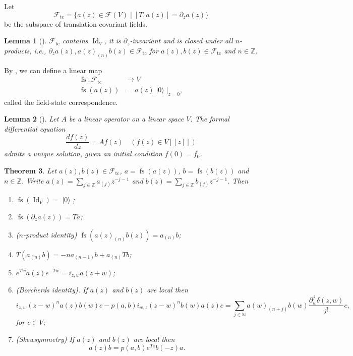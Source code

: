 \documentclass[a4paper, 12pt, reqno]{amsart}
\newtheorem{theorem}{Theorem}[subsection]
\newtheorem{lemma}[theorem]{Lemma}
\theoremstyle{remark}
\numberwithin{equation}{subsection}
\DeclareMathOperator{\Id}{Id}
\DeclareMathOperator{\vac}{|0\rangle}
\DeclareMathOperator{\fs}{fs}
\DeclareMathOperator{\tc}{tc}
\begin{document}
Let
\begin{equation*}
  \mathcal{F}_{\tc} = \{a(z) \in \mathcal{F}(V) \mid [T, a(z)] = \partial_za(z)\}
\end{equation*}
be the subspace of translation covariant fields.

\begin{lemma}[{\cite[Lemma 3]{callegaro_introduction_2017}}]
  \label{lmm:5}
  $\mathcal{F}_{\tc}$ contains $\Id_V$, it is $\partial_z$-invariant and is closed under all $n$-products, i.e., $\partial_za(z), a(z)_{(n)}b(z) \in \mathcal{F}_{\tc}$ for $a(z), b(z) \in \mathcal{F}_{\tc}$ and $n \in \mathbb{Z}$.
\end{lemma}

By , we can define a linear map
\begin{align*}
  \fs: \mathcal{F}_{\tc} &\to V \\
  \fs(a(z)) &= a(z)\vac|_{z = 0},
\end{align*}
called the field-state correspondence.

\begin{lemma}[{\cite[Proposition 4.3.2]{nozaradan_introduction_2008}}]
  \label{lmm:6}
  Let $A$ be a linear operator on a linear space $V$.
  The formal differential equation
  \begin{equation*}
    \frac{df(z)}{dz} = Af(z) \quad (f(z) \in V[[z]])
  \end{equation*}
  admits a unique solution, given an initial condition $f(0)=f_0$.
\end{lemma}

\begin{theorem}
  \label{thr:12}
  Let $a(z), b(z) \in \mathcal{F}_{\tc}$, $a = \fs(a(z))$, $b = \fs(b(z))$ and $n \in \mathbb{Z}$.
  Write $a(z) = \sum_{j \in \mathbb{Z}}a_{(j)}z^{-j - 1}$ and $b(z) = \sum_{j \in \mathbb{Z}}b_{(j)}z^{-j - 1}$.
  Then
  \begin{enumerate}
  \item $\fs(\Id_V) = \vac$;
  \item $\fs(\partial_za(z)) = Ta$;
  \item ($n$-product identity) $\fs(a(z)_{(n)}b(z)) = a_{(n)}b$;
  \item $T(a_{(n)}b) = -na_{(n - 1)}b + a_{(n)}Tb$;
  \item $e^{Tw}a(z)e^{-Tw} = i_{z, w}a(z + w)$;
  \item (Borcherds identity). If $a(z)$ and $b(z)$ are local then
    \begin{equation*}
      i_{z,w}(z-w)^na(z)b(w)c-p(a,b)i_{w,z}(z-w)^nb(w)a(z)c=\sum_{j\in \mathbb{N}}a(w)_{(n+j)}b(w)\frac{\partial^j_w\delta(z,w)}{j!}c,
    \end{equation*}
    for $c\in V$;
  \item (Skewsymmetry) If $a(z)$ and $b(z)$ are local then
    \begin{equation*}
      a(z)b=p(a,b)e^{Tz}b(-z)a.
    \end{equation*}
  \end{enumerate}
\end{theorem}
\end{document}
